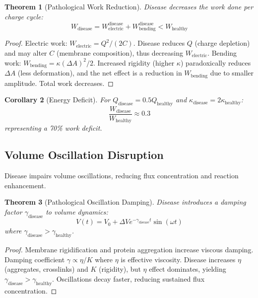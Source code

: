 \documentclass[11pt,twocolumn,a4paper]{article}
\newtheorem{theorem}{Theorem}[section]
\newtheorem{corollary}[theorem]{Corollary}
\theoremstyle{definition}
\theoremstyle{remark}
\begin{document}
\begin{theorem}[Pathological Work Reduction]
\label{thm:pathological_work}
Disease decreases the work done per charge cycle:
\begin{equation}
W_{\text{disease}} = W_{\text{electric}}^{\text{disease}} + W_{\text{bending}}^{\text{disease}} < W_{\text{healthy}}
\end{equation}
\end{theorem}

\begin{proof}
Electric work: $W_{\text{electric}} = Q^2/(2C)$. Disease reduces $Q$ (charge depletion) and may alter $C$ (membrane composition), thus decreasing $W_{\text{electric}}$. Bending work: $W_{\text{bending}} = \kappa (\Delta A)^2/2$. Increased rigidity (higher $\kappa$) paradoxically reduces $\Delta A$ (less deformation), and the net effect is a reduction in $W_{\text{bending}}$ due to smaller amplitude. Total work decreases.
\end{proof}

\begin{corollary}[Energy Deficit]
\label{cor:energy_deficit}
For $Q_{\text{disease}} = 0.5 Q_{\text{healthy}}$ and $\kappa_{\text{disease}} = 2\kappa_{\text{healthy}}$:
\begin{equation}
\frac{W_{\text{disease}}}{W_{\text{healthy}}} \approx 0.3
\end{equation}
representing a 70\% work deficit.
\end{corollary}

\subsection{Volume Oscillation Disruption}

Disease impairs volume oscillations, reducing flux concentration and reaction enhancement.

\begin{theorem}[Pathological Oscillation Damping]
\label{thm:oscillation_damping}
Disease introduces a damping factor $\gamma_{\text{disease}}$ to volume dynamics:
\begin{equation}
V(t) = V_0 + \Delta V e^{-\gamma_{\text{disease}} t} \sin(\omega t)
\end{equation}
where $\gamma_{\text{disease}} > \gamma_{\text{healthy}}$.
\end{theorem}

\begin{proof}
Membrane rigidification and protein aggregation increase viscous damping. Damping coefficient $\gamma \propto \eta/K$ where $\eta$ is effective viscosity. Disease increases $\eta$ (aggregates, crosslinks) and $K$ (rigidity), but $\eta$ effect dominates, yielding $\gamma_{\text{disease}} > \gamma_{\text{healthy}}$. Oscillations decay faster, reducing sustained flux concentration.
\end{proof}
\end{document}
